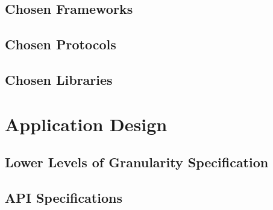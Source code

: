 \documentclass[12pt]{article}
\begin{document}
		
		\subsection{Chosen Frameworks}
					\vspace{0.2in}	
			
		
		\subsection{Chosen Protocols}
		
			\vspace{0.2in}
			
		
		\subsection{Chosen Libraries}
			\vspace{0.2in}

			
	\section{Application Design}
			\vspace{0.2in}
					
		\subsection{Lower Levels of Granularity Specification}
				
		\vspace{0.2in}
		
		\subsection{API Specifications}
				\vspace{0.2in}
				
\end{document}
